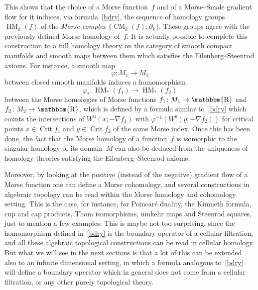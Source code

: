 \documentclass[12pt,twoside]{amsart}
\theoremstyle{plain}
\numberwithin{figure}{section}
\numberwithin{equation}{section}
\def\ss{\operatorname{s}}
\def\u{\operatorname{u}}
\def\Crit{\operatorname{Crit}}
\def\CM{\operatorname{CM}}
\def\HM{\operatorname{HM}}
\def\R{\operatorname{\mathbbm{R}}}
\begin{document}
This shows that the choice of a Morse function~$f$ and of a Morse--Smale gradient flow for it induces, 
via formula~\eqref{bdry}, the sequence of homology groups~$\HM_k (f)$ of the {\it Morse complex}\/ $\{ \CM_k(f),\partial_k \}$. 
These groups agree with the previously defined Morse homology of~$f$.
It is actually possible to complete this construction to a full homology theory on the category of smooth compact manifolds and smooth maps between them which satisfies the Eilenberg--Steenrod axioms. 
For instance, a smooth map
\[
\varphi \colon M_1 \rightarrow M_2
\]
between closed smooth manifolds induces a homomorphism 
\[
\varphi_* \colon \HM_*(f_1) \rightarrow \HM_*(f_2)
\]
between the Morse homologies of Morse functions $f_1 \colon M_1 \rightarrow \R$ and 
$f_2 \colon M_2 \rightarrow \R$, which is defined by a formula similar to~\eqref{bdry} 
which counts the intersections of $W^{\u}(x;-\nabla f_1)$ with $\varphi^{-1}(W^{\ss}(y;-\nabla f_2))$ 
for critical points $x \in \Crit f_1$ and $y \in \Crit f_2$ of the same Morse index. 
Once this has been done, the fact that the Morse homology of a function~$f$ is isomorphic to the singular homology of its domain~$M$ can also be deduced from the uniqueness of homology theories satisfying the Eilenberg--Steenrod axioms.

Moreover, by looking at the positive (instead of the negative) gradient flow of a Morse function one can define a Morse cohomology, and several constructions in algebraic topology can be read within the Morse homology and cohomology setting. This is the case, for instance, 
for Poincar\'e duality, the K\"unneth formula, 
cup and cap products, Thom isomorphisms, umkehr maps and Steenrod squares, just to mention a few examples. This is maybe not too surprising, since the homomorphism defined in~\eqref{bdry} is the boundary operator of a cellular filtration, and all these algebraic topological constructions can be read in cellular homology. But what we will see in the next sections is that a lot of this can be extended also to an infinite dimensional setting, in which a formula analogous to~\eqref{bdry} will define a boundary operator which in general does not come from a cellular filtration, or any other purely topological theory. 
\end{document}
